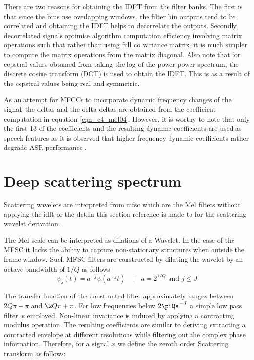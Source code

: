 There are two reasons for obtaining the IDFT from the filter banks.  The first is that since the bins use overlapping windows, the filter bin outputs tend to be correlated and obtaining the IDFT helps to decorrelate the outputs.  Secondly, decorrelated signals optimise algorithm computation efficiency involving matrix operations such that rather than using full co variance matrix, it is much simpler to compute the matrix operations from the matrix diagonal.  Also note that for cepstral values obtained from taking the log of the power power spectrum, the discrete cosine transform (DCT) is used to obtain the IDFT.  This is as a result of the cepstral values being real and symmetric\citep{gales2008application}.

As an attempt for MFCCs to incorporate dynamic frequency changes of the signal, the deltas and the delta-deltas are obtained from the coefficient computation in equation \ref{eqn_c4_mel04}.  However, it is worthy to note that only the first 13 of the coefficients and the resulting dynamic coefficients are used as speech features as it is observed that higher frequency dynamic coefficients rather degrade ASR performance \citep{gales2008application}.

\section{Deep scattering spectrum}\label{sec_c5_wproof}
Scattering wavelets are interpreted from \acrfull{mfsc} which are the Mel filters without applying the \acrshort{idft} or the \acrshort{dct}.In this section reference is made to \citep{anden2011multiscale, anden2014deep, zeghidour2016deep} for the scattering wavelet derivation. 

The Mel scale can be interpreted as dilations of a Wavelet.  In the case of the MFSC it lacks the ability to capture non-stationary structures when outside the frame window.   Such MFSC filters are constructed by dilating the wavelet by an octave bandwidth of $1/Q$ as follows  
\begin{equation}
\psi_j(t)=a^{-j}\psi(a^{-j}t)\quad|\quad a=2^{1/Q}\text{ and }j\le J
\label{eqn_c4_deep00}
\end{equation}

The transfer function of the constructed filter approximately ranges between $2Q\pi-\pi$ and $\2Q\pi+\pi$. For low frequencies below $2\piQa^{-J}$ a simple low pass filter is employed. Non-linear invariance is induced by applying a contracting modulus operation.  The resulting coefficients are similar to deriving extracting a contracted envelope at different resolutions while filtering out the complex phase information.  Therefore, for a signal $x$ we define the zeroth order Scattering transform as follows:

